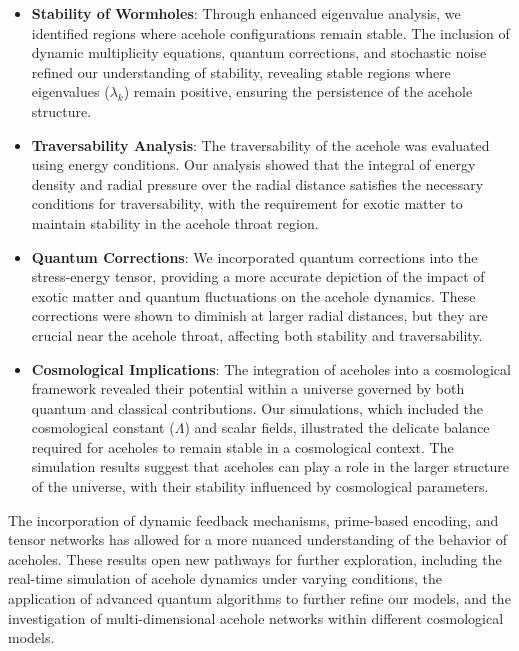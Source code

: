\documentclass{article}
\theoremstyle{plain}
\begin{document}
\begin{itemize}
    \item \textbf{Stability of Wormholes}: Through enhanced eigenvalue analysis, we identified regions where acehole configurations remain stable. The inclusion of dynamic multiplicity equations, quantum corrections, and stochastic noise refined our understanding of stability, revealing stable regions where eigenvalues (\(\lambda_k\)) remain positive, ensuring the persistence of the acehole structure.
    \item \textbf{Traversability Analysis}: The traversability of the acehole was evaluated using energy conditions. Our analysis showed that the integral of energy density and radial pressure over the radial distance satisfies the necessary conditions for traversability, with the requirement for exotic matter to maintain stability in the acehole throat region.
    \item \textbf{Quantum Corrections}: We incorporated quantum corrections into the stress-energy tensor, providing a more accurate depiction of the impact of exotic matter and quantum fluctuations on the acehole dynamics. These corrections were shown to diminish at larger radial distances, but they are crucial near the acehole throat, affecting both stability and traversability.
    \item \textbf{Cosmological Implications}: The integration of aceholes into a cosmological framework revealed their potential within a universe governed by both quantum and classical contributions. Our simulations, which included the cosmological constant (\(\Lambda\)) and scalar fields, illustrated the delicate balance required for aceholes to remain stable in a cosmological context. The simulation results suggest that aceholes can play a role in the larger structure of the universe, with their stability influenced by cosmological parameters.
\end{itemize}

The incorporation of dynamic feedback mechanisms, prime-based encoding, and tensor networks has allowed for a more nuanced understanding of the behavior of aceholes. These results open new pathways for further exploration, including the real-time simulation of acehole dynamics under varying conditions, the application of advanced quantum algorithms to further refine our models, and the investigation of multi-dimensional acehole networks within different cosmological models.
\end{document}
